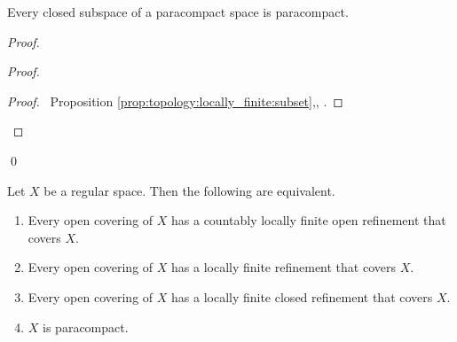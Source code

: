 \begin{thm}
Every closed subspace of a paracompact space is paracompact.
\end{thm}

\begin{proof}
\pf
{}
\begin{proof}
  \begin{proof}
    \pf\ Proposition \ref{prop:topology:locally_finite:subset},, .
  \end{proof}
\end{proof}
\qed
\end{proof}

\begin{lm}[E. Michael (AC)]
\label{lm:topology:paracompact:michaels_lemma}
Let $X$ be a regular space. Then the following are equivalent.
\begin{enumerate}
  \item
  \label{one}
  Every open covering of $X$ has a countably locally finite open refinement that covers $X$.
  \item
  \label{two}
  Every open covering of $X$ has a locally finite refinement that covers $X$.
  \item
  \label{three}
  Every open covering of $X$ has a locally finite closed refinement that covers $X$.
  \item
  \label{four}
  $X$ is paracompact.
\end{enumerate}
\end{lm}

